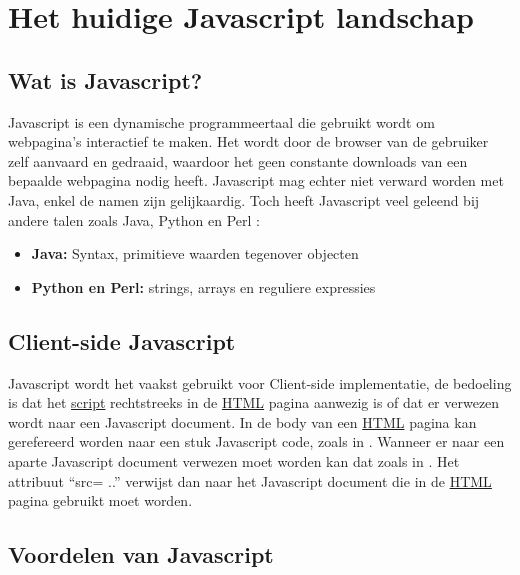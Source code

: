 \chapter{Het huidige Javascript landschap}\label{ch:Javascriptland}

\section{Wat is Javascript?}\label{sec:Javascript}

Javascript is een dynamische programmeertaal die gebruikt wordt om webpagina's interactief te maken. Het wordt door de browser van de gebruiker zelf aanvaard en gedraaid, waardoor het geen constante downloads van een bepaalde webpagina nodig heeft. 
Javascript mag echter niet verward worden met Java, enkel de namen zijn gelijkaardig. Toch heeft Javascript veel geleend bij andere talen zoals Java, Python en Perl : 
	\begin{itemize}
		\item \textbf{Java:} Syntax, primitieve waarden tegenover objecten
		\item \textbf{Python en Perl:} strings, arrays en reguliere expressies
	\end{itemize}
\section{Client-side Javascript}\label{sec:csjs}
Javascript wordt het vaakst gebruikt voor Client-side implementatie, de bedoeling is dat het \hyperref[script]{script} rechtstreeks in de \hyperref[html]{HTML} pagina aanwezig is of dat er verwezen wordt naar een Javascript document.
In de body van een \hyperref[html]{HTML} pagina kan gerefereerd worden naar een stuk Javascript code, zoals in .
	Wanneer er naar een aparte Javascript document verwezen moet worden kan dat zoals in . Het attribuut “src= ..” verwijst dan naar het Javascript document die in de \hyperref[html]{HTML} pagina gebruikt moet worden.   
	\section{Voordelen van Javascript}
	

